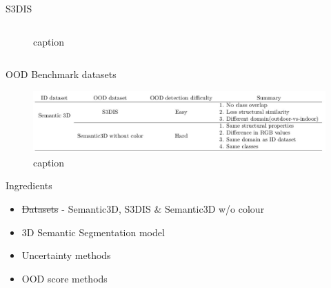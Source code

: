 \documentclass[aspectratio=169]{beamer}
\begin{document}
\begin{frame}{S3DIS}
\begin{columns}
\begin{column}{0.4\textwidth}
\begin{figure}
                \caption{caption}
                \label{fig:s3dis_sample_images}
            \end{figure}
        \end{column}
    \end{columns}
\end{frame}
\begin{frame}{OOD Benchmark datasets}
    \begin{figure}
        \centering
        \includegraphics[scale=0.33]{images/benchmark_table.jpg}
        \caption{caption}
        \label{fig:benchmark_table}
    \end{figure}
\end{frame}
\begin{frame}{Ingredients}
    \begin{itemize}
        \item \st{Datasets} - Semantic3D, S3DIS \& Semantic3D w/o colour
        \item 3D Semantic Segmentation model
        \item Uncertainty methods
        \item OOD score methods
    \end{itemize}
\end{frame}
\end{document}
